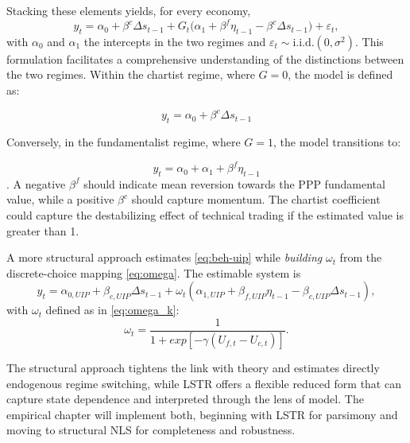 \documentclass[a4paper,10pt,final]{article}    %
\begin{document}
Stacking these elements yields, for every economy,
\begin{equation}
    \label{eq:str_econometric}
    y_t
    = \alpha_0 + \beta^c \Delta s_{t-1} + G_t \bigl(\alpha_1 + \beta^f \eta_{t-1} - \beta^c \Delta s_{t-1}\bigr)
    +\varepsilon_t,
\end{equation}
with $\alpha_0$ and $\alpha_1$ the intercepts in the two regimes and $\varepsilon_{t}\sim\text{i.i.d.}(0,\sigma^{2})$. This formulation facilitates a comprehensive understanding of the distinctions between the two regimes. Within the chartist regime, where $G = 0$, the model is defined as:

$$y_t = \alpha_0 + \beta^c \Delta s_{t-1}$$

Conversely, in the fundamentalist regime, where $G = 1$, the model transitions to:

$$y_t = \alpha_0 + \alpha_1 + \beta^f \eta_{t-1}$$. A negative  $\beta^f$ should indicate mean reversion towards the PPP fundamental value, while a positive $\beta^c$ should capture momentum. The chartist coefficient could capture the destabilizing effect of technical trading if the estimated value is greater than 1.

A more structural approach estimates \eqref{eq:beh-uip} while \emph{building} $\omega_t$ from the discrete-choice mapping \eqref{eq:omega}. The estimable system is
\begin{equation}
    y_t
    = \alpha_{0,UIP} + \beta_{c,UIP} \Delta s_{t-1} + \omega_t (\alpha_{1,UIP} + \beta_{f,UIP} \eta_{t-1} - \beta_{c,UIP} \Delta s_{t-1}),\label{eq:buip_econometric}
\end{equation}
with $\omega_t$ defined as in \eqref{eq:omega_k}:
\begin{equation}
    \label{eq:fund_market_share}
    \omega_t = \frac{1}{1+exp[-\gamma (U_{f,t} - U_{c,t})]}.
\end{equation}

The structural approach tightens the link with theory and estimates directly endogenous regime switching, while LSTR offers a flexible reduced form that can capture state dependence and interpreted through the lens of \citet{proano2013monetary} model. The empirical chapter will implement both, beginning with LSTR for parsimony and moving to structural NLS for completeness and robustness.
\end{document}
